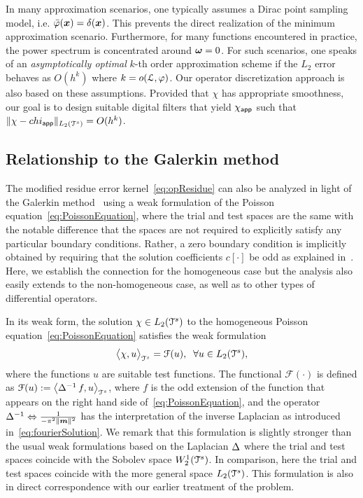 In many approximation scenarios, one typically assumes a Dirac point sampling
model, i.e. ${\bar{\varphi}}(\boldsymbol{x}) = \delta(\boldsymbol{x})$.
This prevents the direct realization of the minimum approximation scenario.
Furthermore, for many functions encountered in practice, the power spectrum is
concentrated around $\boldsymbol{\omega} = 0$. For such scenarios, one speaks of an
\emph{asymptotically optimal} $k$-th order approximation scheme if the $L_2$
error behaves as $O(h^k)$ where $k = o(\mathcal{L},\varphi)$. Our operator
discretization approach is also based on these assumptions. Provided that $\chi$ has appropriate smoothness, our goal is to design suitable digital filters that yield %
$\chi_{\mathsf{app}}$ such that $\lVert \chi - chi_{\mathsf{app}} \rVert_{L_2(\mathcal{T}^s)} = O(h^k)$. %

\subsection{Relationship to the Galerkin method}
\label{sec:Galerkin}
The modified residue error kernel~\eqref{eq:opResidue} can also be analyzed in light of the Galerkin method~\cite{quarteroni08} using a weak formulation of the Poisson equation~\eqref{eq:PoissonEquation}, where the trial and test spaces are the same with the notable difference that the spaces are not required to explicitly satisfy any particular boundary conditions. Rather, a zero boundary condition is implicitly obtained by requiring that the solution coefficients $c[\cdot]$ be odd as explained in~. Here, we establish the connection for the homogeneous case but the analysis also easily extends to the non-homogeneous case, as well as to other types of differential operators.

In its weak form, the solution $\chi \in L_2(\mathcal{T}^s)$ to the homogeneous Poisson equation~\eqref{eq:PoissonEquation} satisfies the weak formulation
\begin{equation}
  \bigl \langle \chi , u \bigr \rangle_{\mathcal{T}^s} = \mathcal{F}(u), \;\; \forall u \in L_2(\mathcal{T}^s),
\end{equation}
where the functions $u$ are suitable test functions. The functional
$\mathcal{F}(\cdot)$ is defined as $\mathcal{F}(u) :=
\bigl \langle \mathop{\Delta^{-1}} f , u \bigr \rangle_{\mathcal{T}^s}$, where $f$ is the odd extension of
the function that appears on the right hand side
of~\eqref{eq:PoissonEquation}, and the operator
$\mathop{\Delta^{-1}} \Leftrightarrow \tfrac{1}{-\pi^2\lVert\boldsymbol{m}\rVert^2}$ has the
interpretation of the inverse Laplacian as introduced
in~\eqref{eq:fourierSolution}. We remark that this formulation is
slightly stronger than the usual weak formulations based on the
Laplacian $\mathop{\Delta}$ where the trial and test spaces coincide with
the Sobolev space $W_2^1(\mathcal{T}^s)$. In comparison, here the trial and
test spaces coincide with the more general space $L_2(\mathcal{T}^s)$. This
formulation is also in direct correspondence with our earlier
treatment of the problem.

